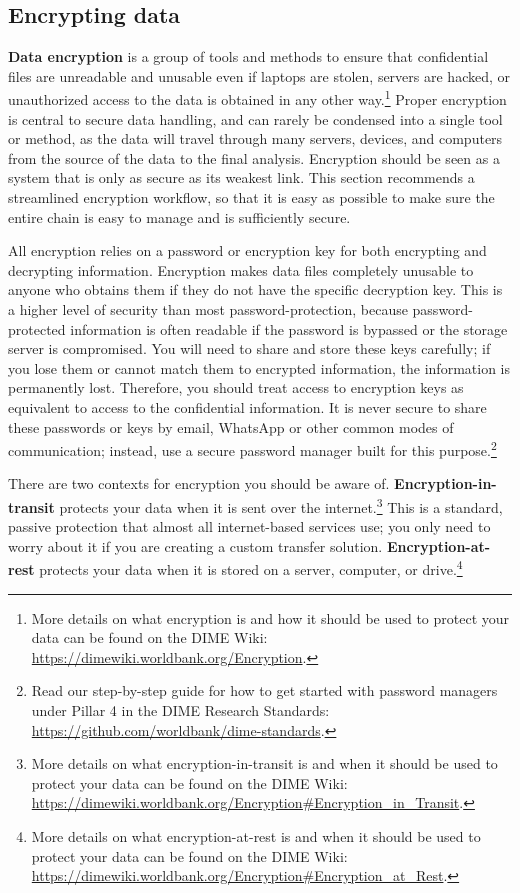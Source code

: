 \documentclass[
]{book}
\begin{document}
\hypertarget{encrypting-data}{%
\subsection*{Encrypting data}\label{encrypting-data}}

\textbf{Data encryption} is a group of tools and methods
to ensure that confidential files are unreadable and unusable
even if laptops are stolen, servers are hacked,
or unauthorized access to the data is obtained in any other way.\footnote{More details on what encryption is and
  how it should be used to protect your data
  can be found on the DIME Wiki:
  \url{https://dimewiki.worldbank.org/Encryption}.}
Proper encryption is central to secure data handling,
and can rarely be condensed into a single tool or method,
as the data will travel through many servers, devices, and computers
from the source of the data to the final analysis.
Encryption should be seen as a system
that is only as secure as its weakest link.
This section recommends a streamlined encryption workflow,
so that it is easy as possible to make sure
the entire chain is easy to manage and is sufficiently secure.

All encryption relies on a password or encryption key
for both encrypting and decrypting information.
Encryption makes data files completely unusable
to anyone who obtains them if they do not have the specific decryption key.
This is a higher level of security than most password-protection,
because password-protected information is often readable
if the password is bypassed or the storage server is compromised.
You will need to share and store these keys carefully;
if you lose them or cannot match them to encrypted information,
the information is permanently lost.
Therefore, you should treat access to encryption keys
as equivalent to access to the confidential information.
It is never secure to share these passwords or keys by email,
WhatsApp or other common modes of communication;
instead, use a secure password manager built for this purpose.\footnote{Read our step-by-step guide for how to get started with password managers
  under Pillar 4 in the DIME Research Standards:
  \url{https://github.com/worldbank/dime-standards}.}

There are two contexts for encryption you should be aware of.
\textbf{Encryption-in-transit} protects your data
when it is sent over the internet.\footnote{More details on what encryption-in-transit is and
  when it should be used to protect your data
  can be found on the DIME Wiki:
  \url{https://dimewiki.worldbank.org/Encryption\#Encryption_in_Transit}.}
This is a standard, passive protection that almost all internet-based services use;
you only need to worry about it if you are creating a custom transfer solution.
\textbf{Encryption-at-rest} protects your data
when it is stored on a server, computer, or drive.\footnote{More details on what encryption-at-rest is and
  when it should be used to protect your data
  can be found on the DIME Wiki:
  \url{https://dimewiki.worldbank.org/Encryption\#Encryption_at_Rest}.}
\end{document}
